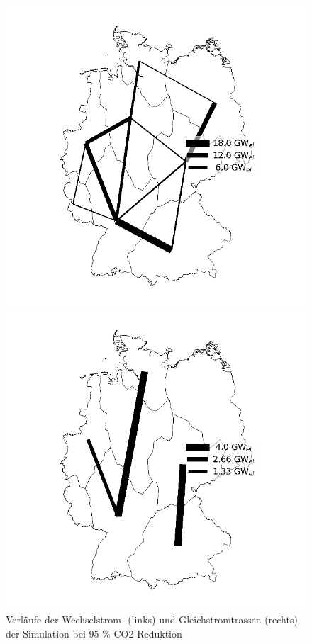 \begin{figure}[!h]
  \begin{minipage}[b]{.4\linewidth} 
     \includegraphics{images/AC-95.png}
  \end{minipage}
  \hspace{.1\linewidth}
  \begin{minipage}[b]{.4\linewidth} 
     \includegraphics{images/DC-95.png}
  \end{minipage}
  \caption{Verläufe der Wechselstrom- (links) und Gleichstromtrassen (rechts) der Simulation bei 95 \% CO2 Reduktion}
  \label{image:Leitungen-95}
\end{figure}



